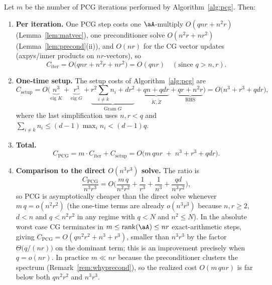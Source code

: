 \begin{lemma}
\label{lem:complexity}
Let $m$ be the number of PCG iterations performed by
Algorithm~\ref{alg:pcg}. Then:
\begin{enumerate}[label=\textup{(\roman*)}]
\item \textbf{Per iteration.} One PCG step costs one $\aA$-multiply
      $O(qnr+n^{2}r)$ (Lemma~\ref{lem:matvec}), one preconditioner solve
      $O(n^{2}r+nr^{2})$ (Lemma~\ref{lem:precond}(ii)), and $O(nr)$ for the CG
      vector updates (axpys/inner products on $nr$-vectors), so
      \begin{equation}\label{eq:periter}
        C_{\mathrm{iter}}=O\!\big(qnr+n^{2}r+nr^{2}\big)=O(qnr)\quad(\text{since }q>n,r).
      \end{equation}
\item \textbf{One-time setup.} The setup costs of Algorithm~\ref{alg:pcg} are
      \begin{equation}\label{eq:onetime}
        C_{\mathrm{setup}}
        = O\!\big(\underbrace{n^{3}}_{\text{eig }K}
        +\underbrace{r^{3}}_{\text{eig }G}
        +\underbrace{r^{2}\textstyle\sum_{i\neq k}n_i+dr^{2}}_{\text{Gram }G}
        +\underbrace{qn+qdr}_{\tilde K,\tilde Z}
        +\underbrace{qr+n^{2}r}_{\text{RHS}}\big)
        = O\!\big(n^{3}+r^{3}+qdr\big),
      \end{equation}
      where the last simplification uses $n,r<q$ and
      $\sum_{i\neq k}n_i\le (d-1)\max_i n_i< (d-1)q$.
\item \textbf{Total.}
      \begin{equation}\label{eq:total}
        C_{\mathrm{PCG}}
        = m\cdot C_{\mathrm{iter}}+C_{\mathrm{setup}}
        = O\!\big(m\,qnr\;+\;n^{3}+r^{3}+qdr\big).
      \end{equation}
\item \textbf{Comparison to the direct $O(n^{3}r^{3})$ solve.} The ratio is
      \begin{equation}\label{eq:ratio}
        \frac{C_{\mathrm{PCG}}}{n^{3}r^{3}}
        = O\!\Big(\frac{m\,q}{n^{2}r^{2}}+\frac1{r^{3}}+\frac1{n^{3}}
        +\frac{q d}{n^{3}r^{2}}\Big),
      \end{equation}
      so PCG is asymptotically cheaper than the direct solve whenever
      $m\,q=o(n^{2}r^{2})$ (the one-time terms are already
      $o(n^{3}r^{3})$ because $n,r\ge2$, $d<n$ and $q<n^{2}r^{2}$ in any regime
      with $q<N$ and $n^2\le N$). In the absolute worst case CG terminates in
      $m\le\operatorname{rank}(\aA)\le nr$ exact-arithmetic steps, giving
      $C_{\mathrm{PCG}}=O(qn^{2}r^{2}+n^{3}+r^{3})$, smaller than $n^{3}r^{3}$
      by the factor $\Theta\!\big(q/(nr)\big)$ on the dominant term; this is an
      improvement precisely when $q=o(nr)$. In practice $m\ll nr$ because the
      preconditioner clusters the spectrum (Remark~\ref{rem:whyprecond}), so
      the realized cost $O(m\,qnr)$ is far below both $qn^2r^2$ and $n^3r^3$.
\end{enumerate}
\end{lemma}

